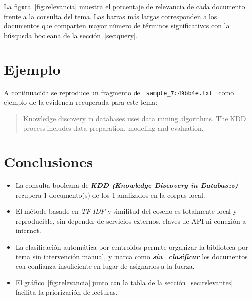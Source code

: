 \documentclass[11pt,a4paper]{article}
\newcommand{\tema}[1]{\textbf{\textit{#1}}}
\newcommand{\nombrearchivo}[1]{\texttt{#1}}
\begin{document}
La figura~\ref{fig:relevancia} muestra el porcentaje de relevancia de cada
documento frente a la consulta del tema. Las barras más largas corresponden a
los documentos que comparten mayor número de términos significativos con la
búsqueda booleana de la sección~\ref{sec:query}.


\section{Ejemplo}
\label{sec:ejemplo}

A continuación se reproduce un fragmento de
\nombrearchivo{ sample\_7c49bb4e.txt } como ejemplo de la evidencia
recuperada para este tema:

\begin{quote}
\small
Knowledge discovery in databases uses data mining algorithms. The KDD process includes data preparation, modeling and evaluation.
\end{quote}


\section{Conclusiones}
\label{sec:conclusiones}

\begin{itemize}
\setlength{\itemsep}{4pt}
  \item La consulta booleana de \tema{ KDD (Knowledge Discovery in Databases) } recupera
        1 documento(s) de los 1
        analizados en la corpus local.
  \item El método basado en \textit{TF-IDF} y similitud del coseno es
        totalmente local y reproducible, sin depender de servicios externos,
        claves de API ni conexión a internet.
  \item La clasificación automática por centroides permite organizar la
        biblioteca por tema sin intervención manual, y marca como
        \tema{sin\_clasificar} los documentos con confianza insuficiente en
        lugar de asignarlos a la fuerza.
  \item El gráfico~\ref{fig:relevancia} junto con la tabla de la
        sección~\ref{sec:relevantes} facilita la priorización de lecturas.
\end{itemize}
\end{document}
